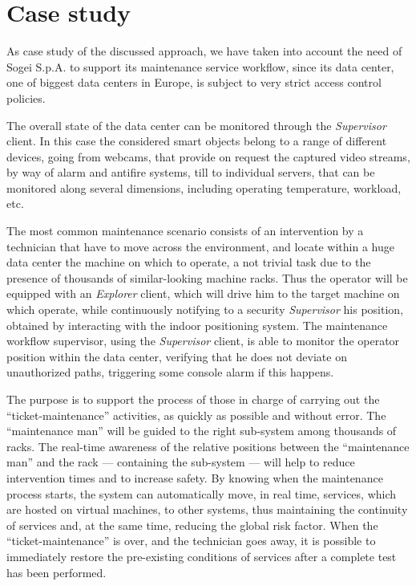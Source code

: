 \section{Case study}\label{case-study}

As case study of the discussed approach, we have taken into account the need of Sogei S.p.A. to support its maintenance service  workflow, since its data center, one of biggest data centers in Europe, is subject to very strict access control policies. 

The overall state of the data center can be monitored through the \emph{Supervisor} client. In this case the considered smart objects belong to a range of different devices, going from webcams, that provide on request the captured video streams, by way of alarm and antifire systems, till to individual servers, that can be monitored along several dimensions, including operating temperature, workload, etc. 

The most common maintenance scenario consists of an intervention by a technician that have to move across the environment, and locate within a huge data center the machine on which to operate, a not trivial task due to the presence of thousands of similar-looking machine racks. Thus the operator will be equipped with an \emph{Explorer} client, which will drive him to the target machine on which operate, while continuously notifying to a security \emph{Supervisor} his position, obtained by interacting with the indoor positioning system.
The maintenance workflow supervisor, using the \emph{Supervisor} client, is able to monitor the operator position within the data center, verifying that he does not deviate on unauthorized paths, triggering some console alarm if this happens.

The purpose is to support  the process of those in charge of carrying out the ``ticket-maintenance'' activities, as quickly  as possible and without error. The ``maintenance man'' will be guided to the right sub-system among thousands of racks. The real-time awareness of the relative positions between the ``maintenance man'' and the rack --- containing the sub-system --- will help to reduce intervention times and to increase safety. By  knowing when the maintenance process starts, the system  can automatically move, in real time, services, which are hosted on virtual machines, to other systems, thus maintaining the continuity of services and, at the same time,  reducing  the global risk factor. When the ``ticket-maint\-enan\-ce'' is over, and the technician goes away, it is possible to immediately  restore  the pre-existing conditions of services after a complete test has been performed.





